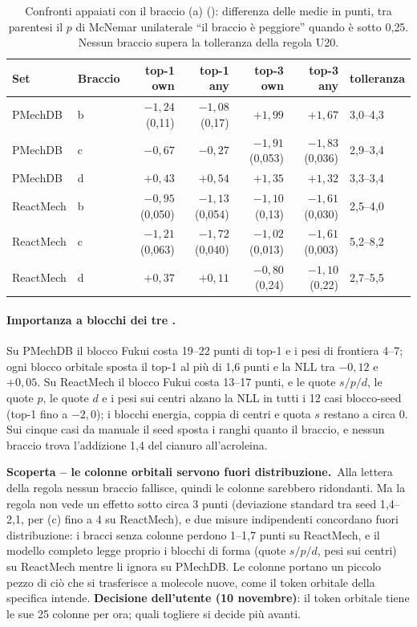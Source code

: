 \documentclass[11pt,a4paper]{report}
\newcommand{\code}[1]{\texttt{\detokenize{#1}}}
\newcommand{\scoperta}[2]{%
  \par\medskip\noindent\colorbox{ksgiallo}{\parbox{\dimexpr\linewidth-2\fboxsep\relax}{%
  \small\textbf{\color{ksrosso}Scoperta -- #1.}\ #2}}\par\medskip}
\begin{document}
\begin{table}[H]
\centering
\caption{Confronti appaiati con il braccio (a) (\code{ksmech-eval compare}): differenza delle medie in
punti, tra parentesi il $p$ di McNemar unilaterale \enquote{il braccio è peggiore} quando è sotto 0{,}25.
Nessun braccio supera la tolleranza della regola U20.}
\label{tab:ablazione-orb-cmp}
\small
\begin{tabular}{@{}llrrrrl@{}}
\toprule
Set & Braccio & top-1 own & top-1 any & top-3 own & top-3 any & tolleranza\\
\midrule
PMechDB & b & $-1{,}24$ (0{,}11) & $-1{,}08$ (0{,}17) & $+1{,}99$ & $+1{,}67$ & 3{,}0--4{,}3\\
PMechDB & c & $-0{,}67$ & $-0{,}27$ & $-1{,}91$ (0{,}053) & $-1{,}83$ (0{,}036) & 2{,}9--3{,}4\\
PMechDB & d & $+0{,}43$ & $+0{,}54$ & $+1{,}35$ & $+1{,}32$ & 3{,}3--3{,}4\\
\midrule
ReactMech & b & $-0{,}95$ (0{,}050) & $-1{,}13$ (0{,}054) & $-1{,}10$ (0{,}13) & $-1{,}61$ (0{,}030) & 2{,}5--4{,}0\\
ReactMech & c & $-1{,}21$ (0{,}063) & $-1{,}72$ (0{,}040) & $-1{,}02$ (0{,}013) & $-1{,}61$ (0{,}003) & 5{,}2--8{,}2\\
ReactMech & d & $+0{,}37$ & $+0{,}11$ & $-0{,}80$ (0{,}24) & $-1{,}10$ (0{,}22) & 2{,}7--5{,}5\\
\bottomrule
\end{tabular}
\end{table}

\paragraph{Importanza a blocchi dei tre \code{orb_a}.} Su PMechDB il blocco Fukui costa 19--22 punti di
top-1 e i pesi di frontiera 4--7; ogni blocco orbitale sposta il top-1 al più di 1{,}6 punti e la NLL tra
$-0{,}12$ e $+0{,}05$. Su ReactMech il blocco Fukui costa 13--17 punti, e le quote $s/p/d$, le quote $p$, le
quote $d$ e i pesi sui centri alzano la NLL in tutti i 12 casi blocco-seed (top-1 fino a $-2{,}0$); i
blocchi energia, coppia di centri e quota $s$ restano a circa 0. Sui cinque casi da manuale il seed
sposta i ranghi quanto il braccio, e nessun braccio trova l'addizione 1,4 del cianuro all'acroleina.

\scoperta{le colonne orbitali servono fuori distribuzione}{Alla lettera della regola nessun braccio
fallisce, quindi le colonne sarebbero ridondanti. Ma la regola non vede un effetto sotto circa 3 punti
(deviazione standard tra seed 1{,}4--2{,}1, per (c) fino a 4 su ReactMech), e due misure indipendenti
concordano fuori distribuzione: i bracci senza colonne perdono 1--1{,}7 punti su ReactMech, e il modello
completo legge proprio i blocchi di forma (quote $s/p/d$, pesi sui centri) su ReactMech mentre li ignora
su PMechDB. Le colonne portano un piccolo pezzo di ciò che si trasferisce a molecole nuove, come il token
orbitale della specifica intende. \textbf{Decisione dell'utente (10 novembre)}: il token orbitale tiene
le sue 25 colonne per ora; quali togliere si decide più avanti.}
\end{document}
